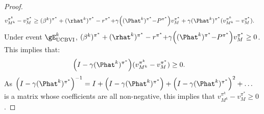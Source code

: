 \begin{subappendices}
\begin{proof}
\begin{align*}
    v_{M^k}^{\pi^k} -v_M^{\pi^*}
    &\ge (\beta^{k})^{\pi^*} +(\rhat^{k})^{\pi^*} -r^{\pi^*} {+}\gamma\Bigl((\Phat^{k})^{\pi^*} {-}P^{\pi^*}\Bigr)v_M^{\pi^*} +\gamma (\Phat^{k})^{\pi^*}(v_{M^k}^{\pi^k} -v_M^{\pi^*}).
\end{align*}
Under event $\gE^{k}_\text{UCBVI}$, $(\beta^{k})^{\pi^*} +(\rhat^{k})^{\pi^*} -r^{\pi^*} {+}\gamma\Bigl((\Phat^{k})^{\pi^*} {-}P^{\pi^*}\Bigr)v_M^{\pi^*}\ge 0$. This implies that:
\begin{align*}
    \Bigl(I-\gamma (\Phat^{k})^{\pi^*}\Bigr)(v_{M^k}^{\pi^k} -v_M^{\pi^*}) &\ge 0.
\end{align*}
As $\Bigl(I-\gamma (\Phat^{k})^{\pi^*}\Bigr)^{-1} = I+ \Bigl(I-\gamma (\Phat^{k})^{\pi^*}\Bigr) +\Bigl(I-\gamma (\Phat^{k})^{\pi^*}\Bigr)^2 +\dots$ is a matrix whose coefficients are all non-negative, this implies that $v_{M^k}^{\pi^k} -v_M^{\pi^*} \ge 0$. 
\end{proof}


\end{subappendices}
